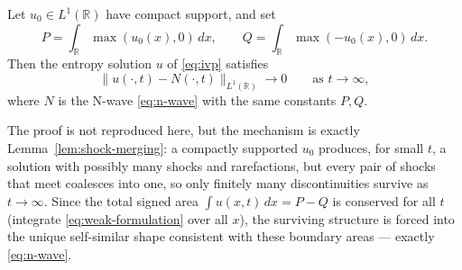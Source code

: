 \begin{theorem}
\label{thm:n-wave-decay}
Let $u_0 \in L^1(\mathbb{R})$ have compact support, and set
\begin{equation}
  \label{eq:pq-areas}
  P = \int_{\mathbb{R}} \max(u_0(x),0)\, dx, \qquad
  Q = \int_{\mathbb{R}} \max(-u_0(x),0)\, dx.
\end{equation}
Then the entropy solution $u$ of \eqref{eq:ivp} satisfies
\begin{equation}
  \|u(\cdot,t) - N(\cdot,t)\|_{L^1(\mathbb{R})} \to 0 \qquad \text{as } t \to \infty,
\end{equation}
where $N$ is the N-wave \eqref{eq:n-wave} with the same constants $P,Q$.
\end{theorem}

The proof is not reproduced here, but the mechanism is exactly
Lemma~\ref{lem:shock-merging}: a compactly supported $u_0$ produces, for
small $t$, a solution with possibly many shocks and rarefactions, but
every pair of shocks that meet coalesces into one, so only finitely many
discontinuities survive as $t\to\infty$. Since the total signed area
$\int u(x,t)\,dx = P-Q$ is conserved for all $t$ (integrate
\eqref{eq:weak-formulation} over all $x$), the surviving structure is
forced into the unique self-similar shape consistent with these boundary
areas --- exactly \eqref{eq:n-wave}.
